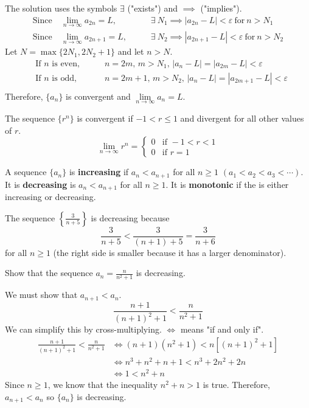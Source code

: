   \begin{solution}
    The solution uses the symbols $\exists$ ("exists") and $\implies$ ("implies").
    \begin{align*}
      \text{Since}\ &\lim\limits_{n \to \infty}a_{2n} = L\text{, }\quad&& \exists\ N_1 \implies |a_{2n}-L|<\varepsilon\ \text{for}\ n>N_1 \\
      \text{Since}\ &\lim\limits_{n \to \infty}a_{2n+1} = L\text{, }\quad&& \exists\ N_2 \implies |a_{2n+1}-L|<\varepsilon\ \text{for}\ n>N_2
    \end{align*}
    Let $N=\max\{2N_1,2N_2 + 1\}$ and let $n>N$.
    \begin{align*}
      &\text{If $n$ is even, }\quad &&n=2m \text{, } m>N_1 \text{, } |a_n - L| = |a_{2m}-L|<\varepsilon \\
      &\text{If $n$ is odd, }\quad &&n=2m+1 \text{, } m>N_2 \text{, } |a_n - L| = |a_{2m+1}-L|<\varepsilon \\
    \end{align*}
    Therefore, $\{a_n\}$ is convergent and $\lim\limits_{n \to \infty}a_n=L$.
  \end{solution}
  \begin{definition}
    The sequence $\{r^n\}$ is convergent if $-1<r\leq1$ and divergent for all other values of $r$.
    $$ \lim_{n \to \infty} r^n =
    \begin{cases}
      0 &\text{if } -1<r<1 \\
      0 &\text{if } r=1
    \end{cases}$$
  \end{definition}
  \begin{definition}
    A sequence $\{a_n\}$ is \textbf{increasing} if $a_n < a_{n+1}$ for all $n\geq 1$ $(a_1 < a_2 < a_3 < \cdots)$. It is \textbf{decreasing} is $a_n < a_{n+1}$ for all $n\geq 1$. It is \textbf{monotonic} if the is either increasing or decreasing.
  \end{definition}
  \begin{example}
    The sequence $\left\{\frac{3}{n+5}\right\}$ is decreasing because
    $$\frac{3}{n+5} < \frac{3}{(n+1)+5}=\frac{3}{n+6}$$
    for all $n\geq 1$ (the right side is smaller because it has a larger denominator).
  \end{example}
  \begin{example}
    Show that the sequence $a_n = \frac{n}{n^2 + 1}$ is decreasing.
  \end{example}
  \begin{solution}[1]
    We must show that $a_{n+1}<a_n$.
    $$\frac{n+1}{(n+1)^2 + 1} < \frac{n}{n^2 + 1}$$
    We can simplify this by cross-multiplying. $\Longleftrightarrow$ means "if and only if".
    \begin{align*}
      \frac{n+1}{(n+1)^2 + 1} < \frac{n}{n^2 + 1} &\Longleftrightarrow (n+1)(n^2 +1)< n[(n+1)^2+1] \\
      &\Longleftrightarrow n^3+n^2+n+1 < n^3+2n^2+2n \\
      &\Longleftrightarrow 1 < n^2 + n
    \end{align*}
    Since $n\geq 1$, we know that the inequality $n^2 + n > 1$ is true. Therefore, $a_{n+1}<a_n$ so $\{a_n\}$ is decreasing.
  \end{solution}
